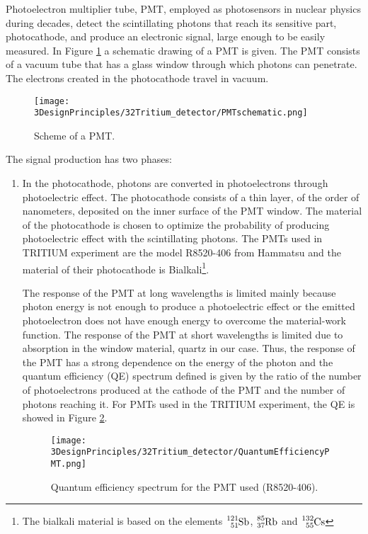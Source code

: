 Photoelectron multiplier tube, PMT, employed as photosensors in nuclear physics during decades, detect the scintillating photons that reach its sensitive part, photocathode, and produce an electronic signal, large enough to be easily measured. In Figure \ref{fig:SchemePMT} a schematic drawing of a PMT is given. The PMT consists of a vacuum tube that has a glass window through which photons can penetrate. The electrons created in the photocathode travel in vacuum. 

\begin{figure}[htbp]
\centering
\texttt{[image: 3DesignPrinciples/32Tritium\_detector/PMTschematic.png]}
\caption{Scheme of a PMT.\label{fig:SchemePMT}~\cite{Knoll}}
\end{figure}

The signal production has two phases:
\begin{enumerate}
\item{} In the photocathode, photons are converted in photoelectrons through photoelectric effect. The photocathode consists of a thin layer, of the order of nanometers, deposited on the inner surface of the PMT window. The material of the photocathode is chosen to optimize the probability of producing photoelectric effect with the scintillating photons. The PMTs used in TRITIUM experiment are the model R8520-406 from Hammatsu \cite{DataSheetPMTs} and the material of their photocathode is Bialkali\footnote{The bialkali material is based on the elements $\ce{^{121}_{51}Sb}$, $\ce{^{85}_{37}Rb}$ and $\ce{^{132}_{55}Cs}$}.

The response of the PMT at long wavelengths is limited mainly because photon energy is not enough to produce a photoelectric effect or the emitted photoelectron does not have enough energy to overcome the material-work function. The response of the PMT at short wavelengths is limited due to absorption in the window material, quartz in our case. Thus, the response of the PMT has a strong dependence on the energy of the photon and the quantum efficiency (QE)  spectrum defined is given by the ratio of the number of photoelectrons produced at the cathode of the PMT and the number of photons reaching it. For PMTs used in the TRITIUM experiment, the QE is showed in Figure \ref{fig:QuantumEfficiencyPMT}.

\begin{figure}[htbp]
\centering
\texttt{[image: 3DesignPrinciples/32Tritium\_detector/QuantumEfficiencyPMT.png]}
\caption{Quantum efficiency spectrum for the PMT used (R8520-406).\label{fig:QuantumEfficiencyPMT}~\cite{DataSheetPMTs}}
\end{figure}


\end{enumerate}
